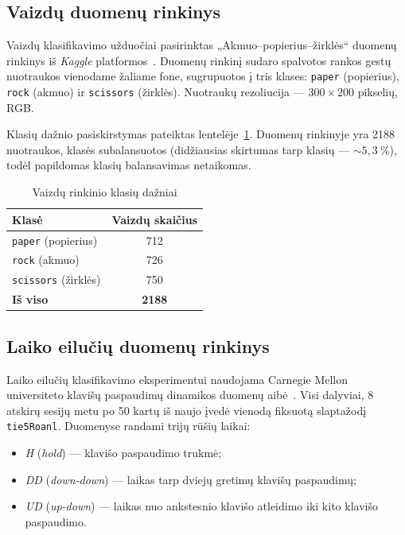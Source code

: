 \documentclass[]{VUMIFTemplateClass}
\begin{document}
\subsection{Vaizdų duomenų rinkinys}

Vaizdų klasifikavimo užduočiai pasirinktas  „Akmuo--popierius--žirklės“ duomenų rinkinys iš \textit{Kaggle} platformos~\cite{rps_dataset}. Duomenų rinkinį sudaro spalvotos rankos gestų nuotraukos vienodame žaliame fone, sugrupuotos į tris klases: \texttt{paper} (popierius), \texttt{rock} (akmuo) ir \texttt{scissors} (žirklės). Nuotraukų rezoliucija --- \(300{\times}200\) pikselių, RGB.

Klasių dažnio pasiskirstymas pateiktas lentelėje~\ref{tab:rps_kiekiai}. Duomenų rinkinyje yra 2188 nuotraukos, klasės subalansuotos (didžiausias skirtumas tarp klasių --- \(\sim 5{,}3~\%\)), todėl papildomas klasių balansavimas netaikomas.

\begin{table}[H]
    \centering
    \caption{Vaizdų rinkinio klasių dažniai}
    \label{tab:rps_kiekiai}
    \begin{tabular}{|l|c|}
        \hline
        \textbf{Klasė} & \textbf{Vaizdų skaičius}\\
        \hline
        \texttt{paper} (popierius)   & 712 \\
        \hline
        \texttt{rock} (akmuo)        & 726 \\
        \hline
        \texttt{scissors} (žirklės)  & 750 \\
        \hline
        \textbf{Iš viso}             & \textbf{2188} \\
        \hline
    \end{tabular}
\end{table}

\subsection{Laiko eilučių duomenų rinkinys}

Laiko eilučių klasifikavimo eksperimentui naudojama Carnegie Mellon universiteto klavišų paspaudimų dinamikos duomenų aibė~\cite{cmu_keystroke}. Visi dalyviai, 8 atskirų sesijų metu po 50 kartų iš naujo įvedė vienodą fiksuotą slaptažodį \texttt{tie5Roanl}. Duomenyse randami trijų rūšių laikai:
\begin{itemize}
    \item \textit{H} (\textit{hold}) --- klavišo paspaudimo trukmė;
    \item \textit{DD} (\textit{down-down}) --- laikas tarp dviejų gretimų klavišų paspaudimų;
    \item \textit{UD} (\textit{up-down}) --- laikas nuo ankstesnio klavišo atleidimo iki kito klavišo paspaudimo.
\end{itemize}
\end{document}
